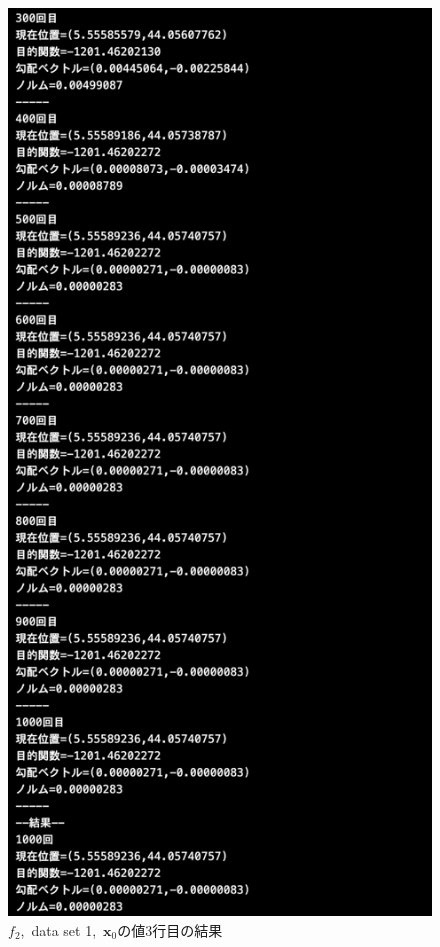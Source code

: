 \documentclass[12pt]{jarticle}
\begin{document}
\begin{figure}[h]
\begin{minipage}{0.5\hsize}
    \end{minipage}
    \begin{minipage}{0.5\hsize}
        \begin{center}
            \includegraphics[scale=0.2]{kadai1_2s_out1_3_3.png}
        \end{center}
    \end{minipage}
    \caption{$f_2$,\ data set 1,\ $\boldsymbol{x}_0$の値3行目の結果}
\end{figure}
\end{document}
